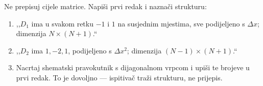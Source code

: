 \begin{ploca}
Ne prepisuj cijele matrice. Napiši prvi redak i naznači strukturu:
\begin{enumerate}[nosep,leftmargin=*]
  \item ,,$D_1$ ima u svakom retku $-1$ i $1$ na susjednim mjestima, sve
        podijeljeno s $\Delta x$; dimenzija $N \times (N{+}1)$.``
  \item ,,$D_2$ ima $1, -2, 1$, podijeljeno s $\Delta x^2$; dimenzija
        $(N{-}1) \times (N{+}1)$.``
  \item Nacrtaj shematski pravokutnik s dijagonalnom vrpcom i upiši te brojeve u
        prvi redak. To je dovoljno --- ispitivač traži strukturu, ne prijepis.
\end{enumerate}
\end{ploca}

